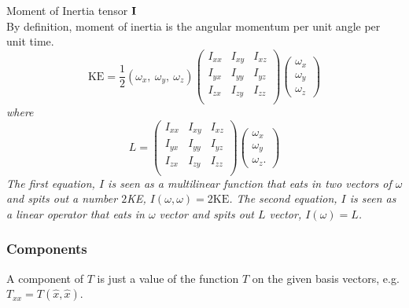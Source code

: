 \begin{exmp*} Moment of Inertia tensor ${\bf I}$ \\
By definition, moment of inertia is the angular momentum per unit angle per unit time.
\emph{ 
%
\begin{equation} 
   \text{KE} = \frac{1}{2} (\omega_x, \ \omega_y, \ \omega_z) 
   \begin{pmatrix} I_{xx} & I_{xy} & I_{xz} \\ I_{yx} & I_{yy} & I_{yz} \\ I_{zx} & I_{zy} & I_{zz} \\ 
   \end{pmatrix} 
   \begin{pmatrix} \omega_x \\ \omega_y \\ \omega_z 
   \end{pmatrix} 
\end{equation} 
%
where 
%
\begin{equation} L =   
   \begin{pmatrix} 
      I_{xx} & I_{xy} & I_{xz} \\ 
      I_{yx} & I_{yy} & I_{yz} \\ 
      I_{zx} & I_{zy} & I_{zz} \\ 
   \end{pmatrix} 
   \begin{pmatrix} 
      \omega_x \\
      \omega_y \\ 
      \omega_z.  
   \end{pmatrix} 
\end{equation} 
%
The first equation, $I$ is seen as a multilinear function that eats in two vectors of $\omega$ and
spits out a number $2$KE, $I(\omega,\omega) = 2\text{KE}$. The second equation, $I$ is seen as a
linear operator that eats in $\omega$ vector and spits out $L$ vector, $I(\omega) = L$. 
}
\end{exmp*}


\subsubsection{Components} 
A component of $T$ is just a value of the function $T$ on the given basis vectors, e.g. $T_{xx}=
T(\hat{x},\hat{x})$. 


